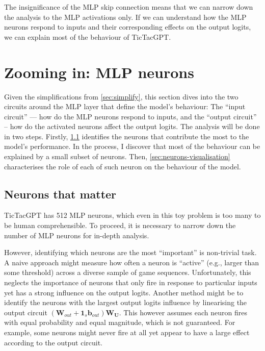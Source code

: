 \documentclass{article}
\newcommand{\ttgpt}{TicTacGPT\xspace}
\renewcommand{\v}[1]{\mathbf{\bm{#1}}}
\newcommand{\m}[1]{\mathbf{\bm{#1}}}
\newcounter{num}
\begin{document}
The insignificance of the MLP skip connection means that we can narrow down the analysis to the MLP activations only. If we can understand how the MLP neurons respond to inputs and their corresponding effects on the output logits, we can explain most of the behaviour of \ttgpt.

\section{Zooming in: MLP neurons}

Given the simplifications from \cref{sec:simplify}, this section dives into the two circuits around the MLP layer that define the model's behaviour: The ``input circuit'' --- how do the MLP neurons respond to inputs, and the ``output circuit'' -- how do the activated neurons affect the output logits. The analysis will be done in two steps. Firstly, \cref{sec:neurons-that-matter} identifies the neurons that contribute the most to the model's performance. In the process, I discover that most of the behaviour can be explained by a small subset of neurons. Then, \cref{sec:neurons-visualisation} characterises the role of each of such neuron on the behaviour of the model.

\subsection{Neurons that matter} \label{sec:neurons-that-matter}



\ttgpt has 512 MLP neurons, which even in this toy problem is too many to be human comprehensible. To proceed, it is necessary to narrow down the number of MLP neurons for in-depth analysis.

However, identifying which neurons are the most ``important'' is non-trivial task. A naive approach might measure how often a neuron is ``active'' (e.g., larger than some threshold) across a diverse sample of game sequences. Unfortunately, this neglects the importance of neurons that only fire in response to particular inputs yet has a strong influence on the output logits. Another method might be to identify the neurons with the largest output logits influence by linearising the output circuit $(\m{W}_{out} + \v{1}_s \v{b}_{out}) \m{W_U}$. This however assumes each neuron fires with equal probability and equal magnitude, which is not guaranteed. For example, some neurons might never fire at all yet appear to have a large effect according to the output circuit.
\end{document}
